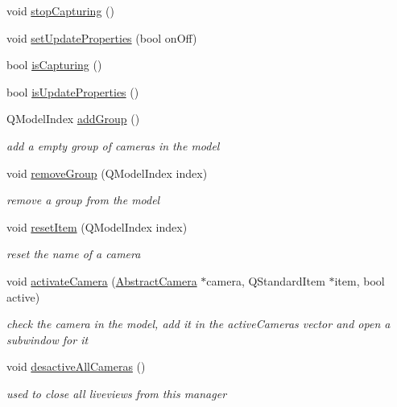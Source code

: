 \begin{DoxyCompactItemize}
\item 
void \mbox{\hyperlink{class_abstract_camera_manager_a5aefb0e4ae48767ead04581a4ee940a8}{stop\+Capturing}} ()
\item 
void \mbox{\hyperlink{class_abstract_camera_manager_abd6c2f0822bef37ca5625b8d3aa43e56}{set\+Update\+Properties}} (bool on\+Off)
\item 
bool \mbox{\hyperlink{class_abstract_camera_manager_a12c4528190897eecd744e9508430910d}{is\+Capturing}} ()
\item 
bool \mbox{\hyperlink{class_abstract_camera_manager_aaa7c4f101bb59d9aa8fdc1ca4bfc25d8}{is\+Update\+Properties}} ()
\item 
Q\+Model\+Index \mbox{\hyperlink{class_abstract_camera_manager_a4eaaf63434076e5d53d19a44f434bec9}{add\+Group}} ()
\begin{DoxyCompactList}\small\item\em add a empty group of cameras in the model \end{DoxyCompactList}\item 
void \mbox{\hyperlink{class_abstract_camera_manager_a5eea7f4d2ab3ea314020b405550b378c}{remove\+Group}} (Q\+Model\+Index index)
\begin{DoxyCompactList}\small\item\em remove a group from the model \end{DoxyCompactList}\item 
void \mbox{\hyperlink{class_abstract_camera_manager_a89cd0d1f9bb47d4abda51ea4f1e08f49}{reset\+Item}} (Q\+Model\+Index index)
\begin{DoxyCompactList}\small\item\em reset the name of a camera \end{DoxyCompactList}\item 
void \mbox{\hyperlink{class_abstract_camera_manager_aeafa7b5e2b0eb5bbc105fe6a0ee5e2f2}{activate\+Camera}} (\mbox{\hyperlink{class_abstract_camera}{Abstract\+Camera}} $\ast$camera, Q\+Standard\+Item $\ast$item, bool active)
\begin{DoxyCompactList}\small\item\em check the camera in the model, add it in the active\+Cameras vector and open a subwindow for it \end{DoxyCompactList}\item 
void \mbox{\hyperlink{class_abstract_camera_manager_a92ed218ecaab3f6a75d3d24e5544d17f}{desactive\+All\+Cameras}} ()
\begin{DoxyCompactList}\small\item\em used to close all liveviews from this manager \end{DoxyCompactList}\item 

\end{DoxyCompactItemize}
